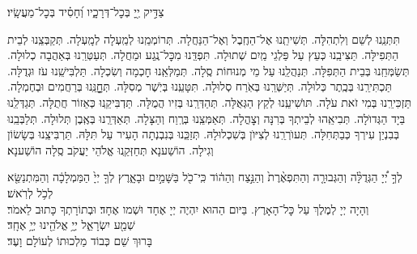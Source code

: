 \documentclass[twoside, openany, parskip=half, 11pt]{book}
\begin{document}
צַדִּ֣יק יְ֖יָ בְּכׇל־דְּרָכָ֑יו וְ֝חָסִ֗יד בְּכׇל־מַעֲשָֽׂיו׃

תִּתְּנֵֽנוּ לְשֵׁם וְלִתְהִלָּה.
תְּשִׁיתֵֽנוּ אֶל־הַחֶֽבֶל וְאֶל־הַנַּחֲלָה.
תְּרוֹמְמֵֽנוּ לְמַֽעְלָה לְמָֽעְלָה.
תְּקַבְּצֵֽנוּ לְבֵית הַתְּפִילָּה.
תַּצִּיבֵֽנוּ כְּעֵץ עַל פַּלְגֵי מַֽיִם שְׁתוּלָה.
תִּפְדֵּֽנוּ מִכׇּל־נֶֽגַע וּמַחֲלָה.
תְּעַטְּרֵֽנוּ בְּאַהֲבָה כְלוּלָה.
תְּשַׂמְּחֵֽנוּ בְּבֵית הַתְּפִלָּה.
תְּנַהֲלֵֽנוּ עַל מֵי מְנוּחוֹת סֶֽלָה.
תְּמַלְּאֵֽנוּ חׇכְמָה וְשִׂכְלָה.
תַּלְבִּישֵֽׁנוּ עֹז וּגְדֻלָּה.
תַּכְתִּירֵֽנוּ בְּכֶֽתֶר כְּלוּלָה.
תְּיַשְּׁרֵֽנוּ בְּאֹֽרַח סְלוּלָה.
תִּטָּעֵֽנוּ בְּיֹֽשֶׁר מְסִלָּה.
תְּחׇׇׇׇׇנֵּֽנוּ בְּרַחֲמִים וּבְחֶמְלָה.
תַּזְכִּירֵֽנוּ בְּמִי זֹאת עֹלָה.
תּוׂשִׁיעֵֽנוּ לְקֵץ הַגְּאֻלָּה.
תְּהַדְּרֵֽנוּ בְּזִיו הֲמֻלָּה.
תַּדְבִּיקֵֽנוּ כְּאֵזוֹר חֲתֻלָּה.
תְּגַדְּלֵֽנוּ בַּיָד הַגְּדוׂלָה.
תְּבִיאֵֽהוּ לְבֵיתְךָ בְּרִנָּה וְצׇהֳלָה.
תְּאַמְּצֵֽנוּ בְּרֶֽוַח וְהַצָּלָה.
תְּאַדְּרְֵנוּ בְּאֶֽבֶן תְּלוּלָה.
תְּלַבְּבֵֽנוּ בְּבִנְיַן עִירְךָ כְּבַתְּחִלָּה.
תְּעוׂרְרֵֽנוּ לְצִיּוׂן בְּשִׁכְלוּלָהּ.
תְּזַכְֵּנוּ בְּנִבְנְתָה הָעִיר עַל תִּלָּהּ.
תַּרְבִּיצֵֽנוּ בְּשָׂשׂוֹן וְגִילָה.
הוֹשַׁענָא תְּחַזְּקֵֽנוּ אֱלֹהֵי יַעֲקֹב סֶֽלָה הוֹשַׁענָא׃

לְךָ֣ יְ֠יָ הַגְּדֻלָּ֨ה וְהַגְּבוּרָ֤ה וְהַתִּפְאֶ֨רֶת֙ וְהַנֵּ֣צַח וְהַה֔וֹד
כִּֽי־כֹ֖ל בַּשָּׁמַ֣יִם וּבָאָ֑רֶץ לְךָ֤ יְיָ֙ הַמַּמְלָכָ֔ה
וְהַמִּתְנַשֵּׂ֖א לְכֹ֥ל לְרֹֽאשׁ׃\\
וְהָיָה יְיָ לְמֶלֶךְ עַל כׇּל־הָאָרֶץ. בַּיּום הַהוּא יִהְיֶה יְיָ אֶחָד וּשְׁמו אֶחָד׃ וּבְתוֹרָתְךָ כָּתוּב לֵאמֹר׃ \\
שְׁמַ֖ע יִשְׂרָאֵ֑ל יְיָ֥ אֱלֹהֵ֖ינוּ יְיָ֥ אֶחָֽד׃\\
בָּרוּךְ שֵׁם כְּבוֹד מַלְכוּתוֹ לְעוֹלָם וָעֶד׃
\end{document}
